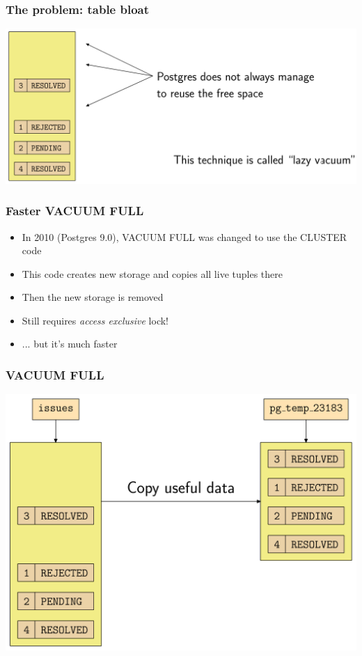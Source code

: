 \begin{frame}
  \frametitle{The problem: table bloat}
  \includegraphics[height=\sizeforimages\textheight]{images/bloat_02.png}
\end{frame}

\begin{frame}
  \frametitle{Faster VACUUM FULL}
  \begin{itemize}
    \item In 2010 (Postgres 9.0), VACUUM FULL was changed to use the CLUSTER code
    \item This code creates new storage and copies all live tuples there
    \item Then the new storage is removed
    \item Still requires \emph{access exclusive} lock!
    \item ... but it's much faster
  \end{itemize}
\end{frame}

\begin{frame}
  \frametitle{VACUUM FULL}
  \includegraphics[height=\sizeforimages\textheight]{images/vacuum_full_01.png}
\end{frame}


